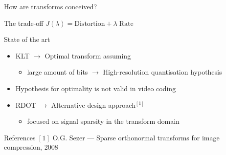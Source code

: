 \documentclass[10pt]{beamer} %
\begin{document}
\begin{frame}{How are transforms conceived?}
	\begin{block}{The trade-off}
		$J(\lambda) = \text{Distortion} + \lambda \; \text{Rate}$
	\end{block}
	\begin{block}{State of the art}
		\begin{itemize}
			\item KLT $\to$ Optimal transform assuming
				\begin{itemize}
					\item large amount of bits $\to$ High-resolution
						quantisation hypothesis
				\end{itemize}
			\item Hypothesis for optimality is not valid in video
				coding
			\item RDOT $\to$ Alternative design approach$^{[1]}$
				\begin{itemize}
					\item focused on signal sparsity in the transform domain
				\end{itemize}
		\end{itemize}
	\end{block}
	\begin{block}{References}
		\scriptsize
		$[1]$ O.G. Sezer --- Sparse orthonormal transforms for image
		compression, 2008\\
	\end{block}
\end{frame}
\end{document}
